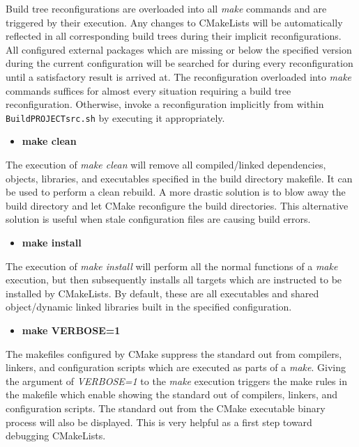 \documentclass[12pt,letterpaper]{article}
\begin{document}
Build tree reconfigurations are overloaded into all \emph{make} commands and are triggered by their execution.  Any changes to CMakeLists will be automatically reflected in all corresponding build trees during their implicit reconfigurations.  All configured external packages which are missing or below the specified version during the current configuration will be searched for during every reconfiguration until a satisfactory result is arrived at.  The reconfiguration overloaded into \emph{make} commands suffices for almost every situation requiring a build tree reconfiguration.  Otherwise, invoke a reconfiguration implicitly from within \verb|BuildPROJECTsrc.sh| by executing it appropriately.

\begin{itemize}
\item \textbf{make clean}
\end{itemize}

The execution of \emph{make clean} will remove all compiled/linked dependencies, objects, libraries, and executables specified in the build directory makefile.  It can be used to perform a clean rebuild.  A more drastic solution is to blow away the build directory and let CMake reconfigure the build directories.  This alternative solution is useful when stale configuration files are causing build errors.

\begin{itemize}
\item \textbf{make install}
\end{itemize}

The execution of \emph{make install} will perform all the normal functions of a \emph{make} execution, but then subsequently installs all targets which are instructed to be installed by CMakeLists.  By default, these are all executables and shared object/dynamic linked libraries built in the specified configuration.

\begin{itemize}
\item \textbf{make VERBOSE=1}
\end{itemize}

The makefiles configured by CMake suppress the standard out from compilers, linkers, and configuration scripts which are executed as parts of a \emph{make}.  Giving the argument of \emph{VERBOSE=1} to the \emph{make} execution triggers the make rules in the makefile which enable showing the standard out of compilers, linkers, and configuration scripts.  The standard out from the CMake executable binary process will also be displayed.  This is very helpful as a first step toward debugging CMakeLists.
\end{document}
